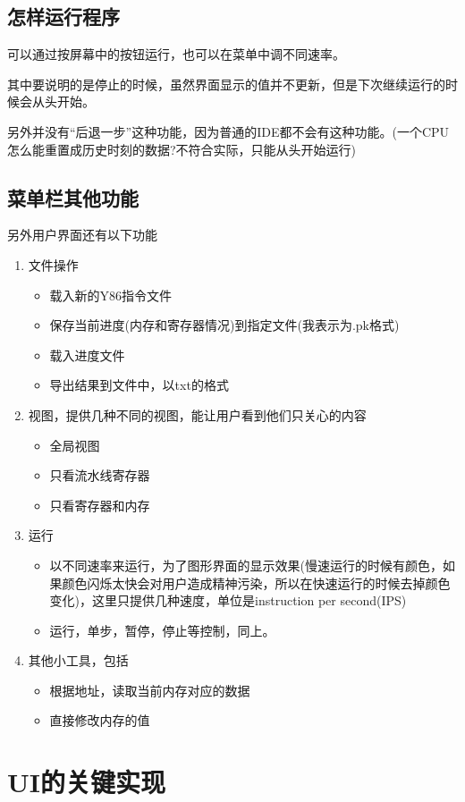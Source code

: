 \documentclass{article}
\begin{document}
\subsection{怎样运行程序}
可以通过按屏幕中的按钮运行，也可以在菜单中调不同速率。

其中要说明的是停止的时候，虽然界面显示的值并不更新，但是下次继续运行的时候会从头开始。

另外并没有“后退一步”这种功能，因为普通的IDE都不会有这种功能。(一个CPU怎么能重置成历史时刻的数据?不符合实际，只能从头开始运行)
\subsection{菜单栏其他功能}
另外用户界面还有以下功能
\begin{enumerate}
\item 文件操作
\begin{itemize}
	\item 载入新的Y86指令文件
	\item 保存当前进度(内存和寄存器情况)到指定文件(我表示为.pk格式)
	\item 载入进度文件
	\item 导出结果到文件中，以txt的格式
\end{itemize}
\item 视图，提供几种不同的视图，能让用户看到他们只关心的内容
\begin{itemize}
	\item 全局视图
	\item 只看流水线寄存器
	\item 只看寄存器和内存
\end{itemize}
\item 运行
\begin{itemize}
	\item 以不同速率来运行，为了图形界面的显示效果(慢速运行的时候有颜色，如果颜色闪烁太快会对用户造成精神污染，所以在快速运行的时候去掉颜色变化)，这里只提供几种速度，单位是instruction per second(IPS)
	\item 运行，单步，暂停，停止等控制，同上。
\end{itemize}
\item 其他小工具，包括
\begin{itemize}
	\item 根据地址，读取当前内存对应的数据
	\item 直接修改内存的值
\end{itemize}
\end{enumerate}
\section{UI的关键实现}
\end{document}
